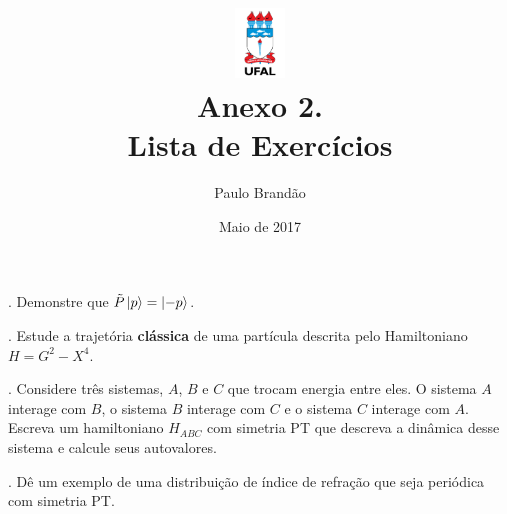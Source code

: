 \documentclass{article}
\title{\includegraphics[width=0.1\textwidth]{ufallogo.png} \\
\Huge{\color{astral}\textbf{Anexo 2. \\ Lista de Exercícios}}}
\author{Paulo Brandão}
\date{Maio de 2017}
\begin{document}
\maketitle


. Demonstre que $\tilde{P}\ket{p} = \ket{-p}$.

\vspace{1cm}


. Estude a trajetória \textbf{clássica} de uma partícula descrita pelo Hamiltoniano $H = G^2 - X^4$.

\vspace{1cm}

. Considere três sistemas, $A$, $B$ e $C$ que trocam energia entre eles. O sistema $A$ interage com $B$, o sistema $B$ interage com $C$ e o sistema $C$ interage com $A$. Escreva um hamiltoniano $H_{ABC}$ com simetria PT que descreva a dinâmica desse sistema e calcule seus autovalores.

\vspace{1cm}

. Dê um exemplo de uma distribuição de índice de refração que seja periódica com simetria PT.
\end{document}
